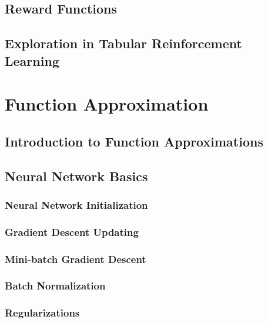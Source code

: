 \subsection{Reward Functions}
\subsection{Exploration in Tabular Reinforcement Learning}



\section{Function Approximation}
\subsection{Introduction to Function Approximations}
\subsection{Neural Network Basics}
\subsubsection{Neural Network Initialization}
\subsubsection{Gradient Descent Updating}
\subsubsection{Mini-batch Gradient Descent}
\subsubsection{Batch Normalization}
\subsubsection{Regularizations}




